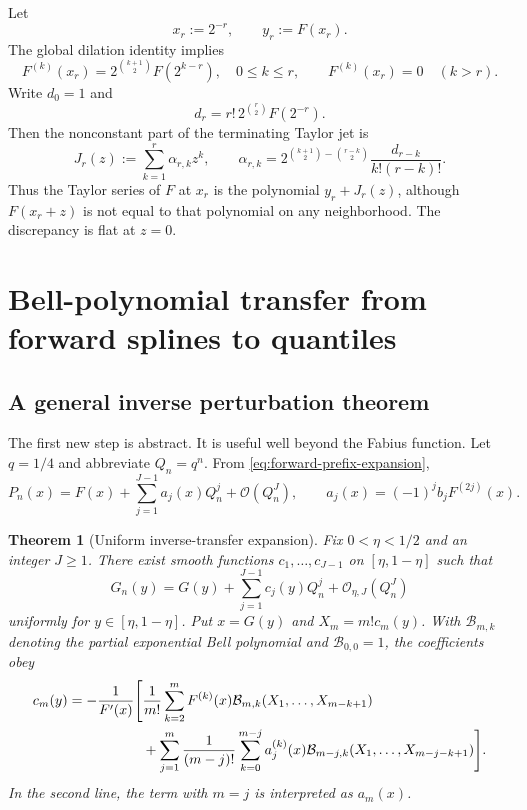 \documentclass[11pt,oneside]{article}
\numberwithin{equation}{section}
\newtheorem{theorem}{Theorem}[section]
\theoremstyle{definition}
\theoremstyle{remark}
\newcommand{\bigO}{\mathcal O}
\newcommand{\InvF}{G}
\newcommand{\Fn}{P_n}
\newcommand{\Gn}{G_n}
\begin{document}
Let
\begin{equation}
 x_r:=2^{-r},\qquad y_r:=F(x_r).
 \label{eq:xr-yr}
\end{equation}
The global dilation identity implies
\begin{equation}
 F^{(k)}(x_r)=2^{\binom{k+1}{2}}F(2^{k-r}),
 \quad 0\le k\le r,
 \qquad
 F^{(k)}(x_r)=0\quad(k>r).
 \label{eq:dyadic-jet}
\end{equation}
Write $d_0=1$ and
\begin{equation}
 d_r=r!\,2^{\binom r2}F(2^{-r}).
 \label{eq:d-def}
\end{equation}
Then the nonconstant part of the terminating Taylor jet is
\begin{equation}
 J_r(z):=\sum_{k=1}^{r}\alpha_{r,k}z^k,
 \qquad
 \alpha_{r,k}
 =2^{\binom{k+1}{2}-\binom{r-k}{2}}
 \frac{d_{r-k}}{k!(r-k)!}.
 \label{eq:Jr}
\end{equation}
Thus the Taylor series of $F$ at $x_r$ is the polynomial $y_r+J_r(z)$, although
$F(x_r+z)$ is not equal to that polynomial on any neighborhood.  The discrepancy is flat
at $z=0$.

\section{Bell-polynomial transfer from forward splines to quantiles}
\label{sec:inverse-transfer}

\subsection{A general inverse perturbation theorem}

The first new step is abstract.  It is useful well beyond the Fabius function.
Let $q=1/4$ and abbreviate $Q_n=q^n$.  From \eqref{eq:forward-prefix-expansion},
\begin{equation}
 \Fn(x)=F(x)+\sum_{j=1}^{J-1}a_j(x)Q_n^j+\bigO(Q_n^J),
 \qquad
 a_j(x)=(-1)^jb_jF^{(2j)}(x).
 \label{eq:an-def}
\end{equation}

\begin{theorem}[Uniform inverse-transfer expansion]
\label{thm:inverse-transfer}
Fix $0<\eta<1/2$ and an integer $J\ge1$.  There exist smooth functions
$c_1,\ldots,c_{J-1}$ on $[\eta,1-\eta]$ such that
\begin{equation}
 \boxed{
 \Gn(y)=\InvF(y)+\sum_{j=1}^{J-1}c_j(y)Q_n^j
 +\bigO_{\eta,J}(Q_n^J)}
 \label{eq:Gn-expansion}
\end{equation}
uniformly for $y\in[\eta,1-\eta]$.  Put $x=\InvF(y)$ and
$X_m=m!c_m(y)$.  With $\mathcal B_{m,k}$ denoting the partial exponential Bell
polynomial and $\mathcal B_{0,0}=1$, the coefficients obey
\begin{align}
 c_m(y)=-\frac1{F'(x)}\Bigg[&
 \frac1{m!}\sum_{k=2}^{m}F^{(k)}(x)
 \mathcal B_{m,k}(X_1,\ldots,X_{m-k+1})
 \notag\\
 &+\sum_{j=1}^{m}\frac1{(m-j)!}
 \sum_{k=0}^{m-j}a_j^{(k)}(x)
 \mathcal B_{m-j,k}(X_1,\ldots,X_{m-j-k+1})
 \Bigg].
 \label{eq:Bell-inverse-recursion}
\end{align}
In the second line, the term with $m=j$ is interpreted as $a_m(x)$.
\end{theorem}
\end{document}
